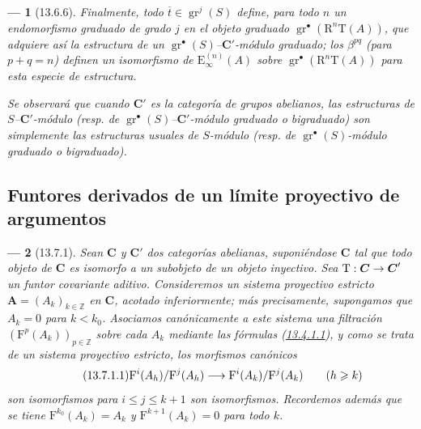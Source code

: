 \documentclass[10pt,oneside,openany]{book}
\theoremstyle{egaenv}\newtheorem*{env}{---}
\theoremstyle{egastatement}
\theoremstyle{egadescription}
\renewcommand{\leq}{\leqslant}
\renewcommand{\geq}{\geqslant}
\renewcommand{\to}{\mathchoice{\longrightarrow}{\rightarrow}{\rightarrow}{\rightarrow}}
\begin{document}
\begin{env}[13.6.6]
Finalmente, todo $\overline t\in\operatorname{gr}^j(S)$ define, para todo
$n$ un endomorfismo graduado de grado $j$ en el objeto graduado $\operatorname{gr}^\bullet(\mathrm R^n\mathrm T(A))$, que adquiere así la
estructura de un
$\operatorname{gr}^\bullet(S)$--\emph{$\boldsymbol{C}'$-módulo graduado}; los $\beta^{pq}$ (para $p+q=n$) definen un \emph{isomorfismo} de $\mathrm E_\infty^{(n)}(A)$ sobre $\operatorname{gr}^\bullet(\mathrm R^n\mathrm T(A))$ para esta especie de estructura.

Se observará que cuando $\boldsymbol{C}'$ es la categoría de \emph{grupos abelianos}, las
estructuras de $S$--$\boldsymbol{C}'$-módulo (resp. de
$\operatorname{gr}^\bullet(S)$--$\boldsymbol{C}'$-módulo graduado o bigraduado) son
simplemente las estructuras usuales de $S$-\emph{módulo} (resp. de
$\operatorname{gr}^\bullet(S)$-módulo graduado o bigraduado).
\end{env}

\subsection{Funtores derivados de un límite proyectivo de argumentos}
\label{subsection:0.13.7}
\label{subsection:0.13.7-fr}
\label{0.13.7}

\begin{env}[13.7.1]
\label{0.13.7.1}
\label{0.13.7.1-fr}
Sean $\boldsymbol{C}$ y $\boldsymbol{C}'$ dos categorías abelianas, suponiéndose $\boldsymbol{C}$ tal que todo objeto de $\boldsymbol{C}$ es isomorfo a un subobjeto de un
objeto inyectivo.
Sea
$\mathrm T:\boldsymbol{C}\to \boldsymbol{C}'$
un funtor covariante aditivo.
Consideremos un \emph{sistema proyectivo estricto}
$\mathbf A=(A_k)_{k\in\mathbb Z}$ en $\boldsymbol{C}$, acotado inferiormente; más
precisamente, supongamos que $A_k=0$ para $k<k_0$. Asociamos canónicamente a este sistema una filtración $(\mathrm F^p(A_k))_{p\in\mathbb Z}$ sobre cada $A_k$ mediante las fórmulas (\hyperref[0.13.4.1.1-fr]{13.4.1.1}), y como se trata de un sistema proyectivo \emph{estricto}, los morfismos canónicos
\begin{equation}
\label{0.13.7.1.1-fr}
\tag{13.7.1.1}
\mathrm F^i(A_h)/\mathrm F^j(A_h)\to
\mathrm F^i(A_k)/\mathrm F^j(A_k)\qquad(h\geq k)
\end{equation}
son \emph{isomorfismos} para $i\leq j\leq k+1$ son \emph{isomorfismos}. Recordemos además que se tiene $\mathrm F^{k_0}(A_k)=A_k$ y
$\mathrm F^{k+1}(A_k)=0$ para todo $k$.
\end{env}
\end{document}
